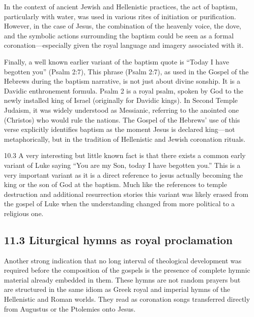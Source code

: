 In the context of ancient Jewish and Hellenistic practices, the act of baptism, particularly with water, was used in various rites of initiation or purification.
However, in the case of Jesus, the combination of the heavenly voice, the dove, and the symbolic actions surrounding the baptism could be seen as a formal coronation---especially given the royal language and imagery associated with it.

Finally, a well known earlier variant of the baptism quote is ``Today I have begotten you'' (Psalm 2:7), This phrase (Psalm 2:7), as used in the Gospel of the Hebrews during the baptism narrative, is not just about divine sonship.
It is a Davidic enthronement formula.
Psalm 2 is a royal psalm, spoken by God to the newly installed king of Israel (originally for Davidic kings).
In Second Temple Judaism, it was widely understood as Messianic, referring to the anointed one (Christos) who would rule the nations.
The Gospel of the Hebrews' use of this verse explicitly identifies baptism as the moment Jesus is declared king---not metaphorically, but in the tradition of Hellenistic and Jewish coronation rituals.

10.3 A very interesting but little known fact is that there exists a common early variant of Luke saying ``You are my Son, today I have begotten you.'' This is a very important variant as it is a direct reference to jesus actually becoming the king or the son of God at the baptism.
Much like the references to temple destruction and additional resurrection stories this variant was likely erased from the gospel of Luke when the understanding changed from more political to a religious one.

\subsection{11.3 Liturgical hymns as royal proclamation}\label{subsec:liturgical-hymns-as-royal-proclamation}

Another strong indication that no long interval of theological development was required before the composition of the gospels is the presence of complete hymnic material already embedded in them.
These hymns are not random prayers but are structured in the same idiom as Greek royal and imperial hymns of the Hellenistic and Roman worlds.
They read as coronation songs transferred directly from Augustus or the Ptolemies onto Jesus.

